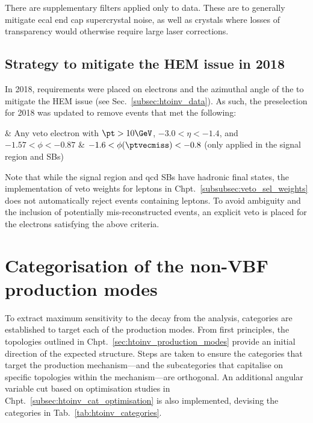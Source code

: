 \medskip

\noindent{}There are supplementary filters applied only to data. These are to generally mitigate \acrshort{ecal} end cap supercrystal noise, as well as crystals where losses of transparency would otherwise require large laser corrections.




\subsection{Strategy to mitigate the HEM issue in 2018}
\label{subsec:htoinv_hem_mitigation}

In 2018, requirements were placed on electrons and the azimuthal angle of the \ptmiss to mitigate the HEM issue (see Sec.~\ref{subsec:htoinv_data}). As such, the preselection for 2018 was updated to remove events that met the following:
\medskip
\begin{easylist}[itemize]
    \cutflowlistprops
    & Any veto electron \vetoEle with $\pt > \text{10}\GeV$, $-\text{3.0} < \eta < -\text{1.4}$, and $-\text{1.57} < \phi < -\text{0.87}$
    & $-\text{1.6} < \phi(\ptvecmiss) < -\text{0.8}$ (only applied in the signal region and \glspl{SB})
\end{easylist}


\medskip

\noindent{}Note that while the signal region and \acrshort{qcd} \glspl{SB} have hadronic final states, the implementation of veto weights for leptons in Chpt.~\ref{subsubsec:veto_sel_weights} does not automatically reject events containing leptons. To avoid ambiguity and the inclusion of potentially mis-reconstructed events, an explicit veto is placed for the electrons satisfying the above criteria.




\section{Categorisation of the non-VBF production modes}
\label{sec:htoinv_categorisation}


To extract maximum sensitivity to the \higgstoinv decay from the analysis, categories are established to target each of the production modes. From first principles, the topologies outlined in Chpt.~\ref{sec:htoinv_production_modes} provide an initial direction of the expected structure. Steps are taken to ensure the categories that target the production mechanism---and the subcategories that capitalise on specific topologies within the mechanism---are orthogonal. An additional angular variable cut based on optimisation studies in Chpt.~\ref{subsec:htoinv_cat_optimisation} is also implemented, devising the categories in Tab.~\ref{tab:htoinv_categories}.

